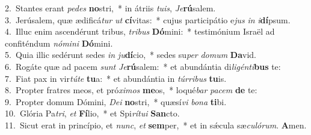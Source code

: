 {2.~}Stantes erant \textit{pe}\textit{des} \textbf{no}stri,~* in átriis \textit{tu}\textit{is}, \textit{Je}\textbf{rú}salem.\\
{3.~}Jerúsalem, quæ ædificá\textit{tur} \textit{ut} \textbf{cí}vitas:~* cujus participátio e\textit{jus} \textit{in} \textit{i}\textbf{dí}psum.\\
{4.~}Illuc enim ascendérunt tribus, \textit{tri}\textit{bus} \textbf{Dó}mini:~* testimónium Israël ad confiténdum \textit{nó}\textit{mi}\textit{ni} \textbf{Dó}mini.\\
{5.~}Quia illic sedérunt sedes \textit{in} \textit{ju}\textbf{dí}cio,~* sedes su\textit{per} \textit{do}\textit{mum} \textbf{Da}vid.\\
{6.~}Rogáte quæ ad pacem \textit{sunt} \textit{Je}\textbf{rú}salem:~* et abundántia di\textit{li}\textit{gén}\textit{ti}\textbf{bus} te:\\
{7.~}Fiat pax in vir\textit{tú}\textit{te} \textbf{tu}a:~* et abundántia in \textit{túr}\textit{ri}\textit{bus} \textbf{tu}is.\\
{8.~}Propter fratres meos, et pró\textit{xi}\textit{mos} \textbf{me}os,~* loqué\textit{bar} \textit{pa}\textit{cem} \textbf{de} te:\\
{9.~}Propter domum Dómini, \textit{De}\textit{i} \textbf{no}stri,~* quæsí\textit{vi} \textit{bo}\textit{na} \textbf{ti}bi.\\
{10.~}Glória Pa\textit{tri}, \textit{et} \textbf{Fí}lio,~* et Spi\textit{rí}\textit{tu}\textit{i} \textbf{San}cto.\\
{11.~}Sicut erat in princípio, et \textit{nunc}, \textit{et} \textbf{sem}per,~* et in sǽcula sæ\textit{cu}\textit{ló}\textit{rum}. \textbf{A}men.\\
